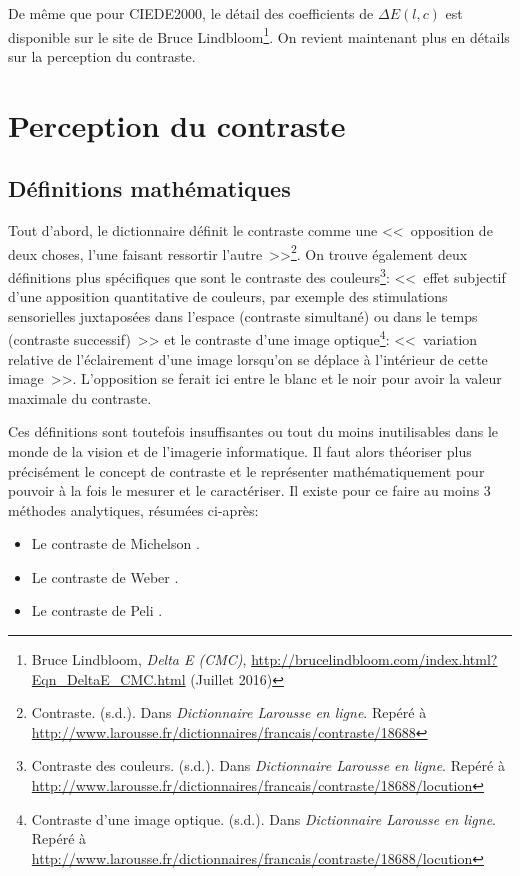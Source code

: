 	\par De même que pour CIEDE2000, le détail des coefficients de $\Delta E(l,c)$ est disponible sur le site de Bruce Lindbloom\footnote{Bruce Lindbloom, \textit{Delta E (CMC)}, \url{http://brucelindbloom.com/index.html?Eqn_DeltaE_CMC.html} (Juillet 2016)}. On revient maintenant plus en détails sur la perception du contraste.

\chapter{Perception du contraste}
	\section{Définitions mathématiques}
	\par Tout d'abord, le dictionnaire définit le contraste comme une <<~opposition de deux choses, l'une faisant ressortir l'autre~>>\footnote{Contraste. (s.d.). Dans \textit{Dictionnaire Larousse en ligne}. Repéré à \url{http://www.larousse.fr/dictionnaires/francais/contraste/18688}}. On trouve également deux définitions plus spécifiques que sont le contraste des couleurs\footnote{Contraste des couleurs. (s.d.). Dans \textit{Dictionnaire Larousse en ligne}. Repéré à \url{http://www.larousse.fr/dictionnaires/francais/contraste/18688/locution}}: <<~effet subjectif d'une apposition quantitative de couleurs, par exemple des stimulations sensorielles juxtaposées dans l'espace (contraste simultané) ou dans le temps (contraste successif)~>> et le contraste d'une image optique\footnote{Contraste d'une image optique. (s.d.). Dans \textit{Dictionnaire Larousse en ligne}. Repéré à \url{http://www.larousse.fr/dictionnaires/francais/contraste/18688/locution}}: <<~variation relative de l'éclairement d'une image lorsqu'on se déplace à l'intérieur de cette image~>>. L'opposition se ferait ici entre le blanc et le noir pour avoir la valeur maximale du contraste.
	
	\par Ces définitions sont toutefois insuffisantes ou tout du moins inutilisables dans le monde de la vision et de l'imagerie informatique. Il faut alors théoriser plus précisément le concept de contraste et le représenter mathématiquement pour pouvoir à la fois le mesurer et le caractériser.
	Il existe pour ce faire au moins 3 méthodes analytiques, résumées ci-après:
	\begin{itemize}
		\item Le contraste de Michelson \citep{michelson_studies_1995,winkler_issues_1999,fuchs_traite_2003}.
		\item Le contraste de Weber \citep{winkler_computing_1999,winkler_issues_1999}.
		\item Le contraste de Peli \citep{peli_contrast_1990,winkler_computing_1999,winkler_issues_1999}.
	\end{itemize}

